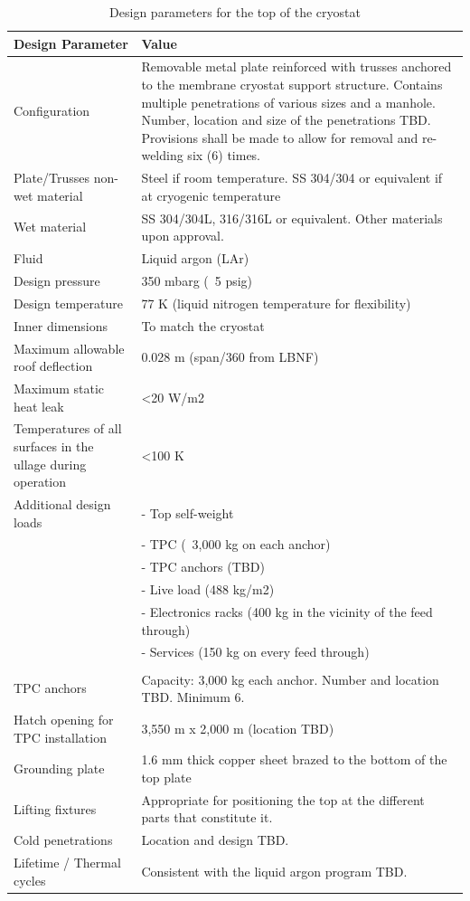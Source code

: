 \begin{table}[htpb]
\caption{Design parameters for the top of the cryostat}
\label{tbl:cryostat-top-parameters}
\centering
\begin{tabular}{|p{}|p{}|}
\hline
 \textbf{Design Parameter} & \textbf{Value} \\ \hline
 Configuration &  Removable metal plate reinforced with trusses anchored to the membrane cryostat support structure. Contains multiple penetrations of various sizes and a manhole. Number, location and size of the penetrations TBD. Provisions shall be made to allow for removal and re-welding six (6) times.\\ \hline
Plate/Trusses non-wet material  &  Steel if room temperature.
SS 304/304 or equivalent if at cryogenic temperature
\\ \hline
Wet material  & SS 304/304L, 316/316L or equivalent. 
Other materials upon approval.
 \\ \hline
 Fluid & Liquid argon (LAr) \\ \hline
Design pressure  & 350 mbarg (~5 psig) \\ \hline
Design temperature  & 77 K (liquid nitrogen temperature for flexibility) \\ \hline
Inner dimensions  & To match the cryostat \\ \hline
Maximum allowable roof deflection  & 0.028 m (span/360 from LBNF) \\ \hline
Maximum static heat leak  & \textless 20 W/m2  \\ \hline
 Temperatures of all surfaces in the ullage during operation & \textless 100 K \\ \hline
Additional design loads  &  -	Top self-weight \\
& -	TPC (~3,000 kg on each anchor)\\
& -	TPC anchors (TBD)\\
& -	Live load (488 kg/m2)\\
& -	Electronics racks (400 kg in the vicinity of the feed through)\\
& -	Services (150 kg on every feed through)\\
\\ \hline
TPC anchors  & Capacity: 3,000 kg each anchor.
Number and location TBD. Minimum 6.
 \\ \hline
 Hatch opening for TPC installation &  3,550 m x 2,000 m (location TBD)\\ \hline
Grounding plate  &  1.6 mm thick copper sheet brazed to the bottom of the top plate\\ \hline
Lifting fixtures  & Appropriate for positioning the top at the different parts that constitute it. \\ \hline
Cold penetrations  & Location and design TBD. \\ \hline
Lifetime / Thermal cycles  & Consistent with the liquid argon program TBD. \\ \hline
\end{tabular}
\end{table}

